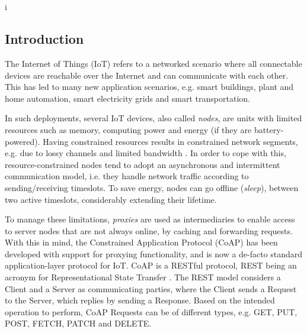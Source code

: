 \chapter[\paperIIItitle]{\texorpdfstring{%
                \paperIIItitle}{%
                \paperIIItitle}}

\label{ch:oscore}
{i

\section{Introduction}
\label{s:introduction}

The Internet of Things (IoT) refers to a networked scenario where all connectable devices are reachable over the Internet and can communicate with each other. This has led to many new application scenarios, e.g. smart buildings, plant and home automation, smart electricity grids and smart transportation.

In such deployments, several IoT devices, also called \emph{nodes}, are units with limited resources such as memory, computing power and energy (if they are battery-powered). Having constrained resources results in constrained network segments, e.g. due to lossy channels and limited bandwidth \cite{rfc7228}. In order to cope with this, resource-constrained nodes tend to adopt an asynchronous and intermittent communication model, i.e. they handle network traffic according to sending/receiving timeslots. To save energy, nodes can go offline (\emph{sleep}), between two active timeslots, considerably extending their lifetime.

To manage these limitations, \emph{proxies} are used as intermediaries to enable access to server nodes that are not always online, by caching and forwarding requests.  With this in mind, the Constrained Application Protocol (CoAP) \cite{rfc7252} has been developed with support for proxying functionality, and is now a de-facto standard application-layer protocol for IoT. CoAP is a RESTful protocol, REST being an acronym for Representational State Transfer \cite{fielding2000architectural}. The REST model considers a Client and a Server as communicating parties, where the Client sends a Request to the Server, which replies by sending a Response. Based on the intended operation to perform, CoAP Requests can be of different types, e.g. GET, PUT, POST, FETCH, PATCH and DELETE.

}

